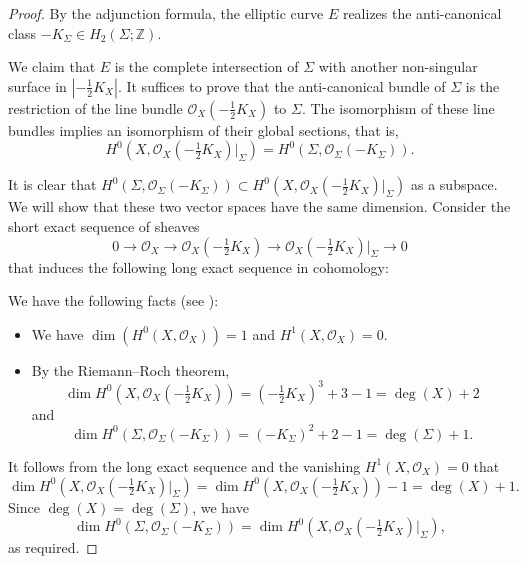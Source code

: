 \documentclass[11pt]{amsart}
\numberwithin{equation}{section}
\theoremstyle{definition}
\theoremstyle{plain}
\theoremstyle{remark}
\begin{document}
\begin{proof}
By the adjunction formula, the elliptic curve $E$ realizes the anti-canonical class $-K_\Sigma \in H_2(\Sigma; \mathbb{Z})$.

We claim that $E$ is the complete intersection of $\Sigma$ with another non-singular surface in $|-\frac{1}{2}K_X|$. It suffices 
to prove that the anti-canonical bundle of $\Sigma$ is the restriction of the line bundle $\mathcal{O}_X(-\frac{1}{2}K_X)$ to $\Sigma$. The isomorphism of these line bundles implies an isomorphism of their global sections, that is,
 $$H^0\left(X,\mathcal{O}_X\left(-\tfrac{1}{2}K_X\right)|_\Sigma\right)=H^0\left(\Sigma,\mathcal{O}_\Sigma\left(-K_\Sigma\right)\right).$$
 
It is clear that $H^0(\Sigma,\mathcal{O}_\Sigma(-K_\Sigma)) \subset H^0(X,\mathcal{O}_X(-\frac{1}{2}K_X)|_\Sigma)$ as a subspace. We will show that these two vector spaces have the same dimension.
 Consider the short exact sequence of sheaves
 $$0\longrightarrow \mathcal{O}_X\longrightarrow \mathcal{O}_X\left(-\tfrac{1}{2}K_X\right)\longrightarrow \mathcal{O}_X\left(-\tfrac{1}{2}K_X\right)|_\Sigma \longrightarrow 0$$
 that induces the following long exact sequence in cohomology:

 \begin{center}
\end{center}

We have the following facts (see \cite[Section~3.2]{iskovskikh2010algebraic}): 
\begin{itemize}
\item We have $\dim (H^0(X,\mathcal{O}_X))=1$ and $H^1(X,\mathcal{O}_X)=0$.
\item By the Riemann--Roch theorem,
 $$\dim H^0\left(X, \mathcal{O}_X\left(-\tfrac{1}{2}K_X\right)\right)=\left(-\tfrac{1}{2}K_X\right)^3+3-1=\deg (X) +2$$ 
 and 
 $$\dim H^0\left(\Sigma,\mathcal{O}_\Sigma\left(-K_\Sigma\right)\right)=\left(-K_\Sigma\right)^2+2-1=\deg (\Sigma) +1.$$ 
\end{itemize}
It follows from the long exact sequence and the vanishing $H^1(X, \mathcal{O}_X) = 0$ that
 $$\dim H^0\left(X, \mathcal{O}_X\left(-\tfrac{1}{2}K_X\right)|_\Sigma\right)=\dim H^0\left(X, \mathcal{O}_X\left(-\tfrac{1}{2}K_X\right)\right)-1=\deg (X)+1.$$
Since $\deg(X) = \deg(\Sigma)$, we have 
$$\dim H^0(\Sigma,\mathcal{O}_\Sigma(-K_\Sigma))=\dim  H^0\left(X,\mathcal{O}_X\left(-\tfrac{1}{2}K_X\right)|_\Sigma\right),$$
as required.
  \end{proof}
\end{document}
